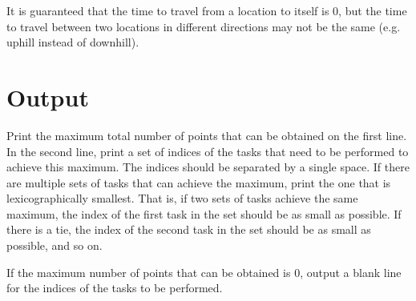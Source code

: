 It is guaranteed that the time to travel from a location to itself is
0, but the time to travel between two locations in different directions may
not be the same (e.g. uphill instead of downhill).

\section*{Output}

Print the maximum total number of points that can be obtained
on the first line.  In the second line, print a set of indices of the
tasks that need to be performed to achieve this maximum.  The indices
should be separated by a single space.  If there are
multiple sets of tasks that can achieve the maximum, print the one
that is lexicographically smallest.  That is, if two sets of tasks
achieve the same maximum, the index of the first task in the set
should be as small as possible.  If there is a tie, the index of the
second task in the set should be as small as possible, and so on.

If the maximum number of points that can be obtained is 0, output a
blank line for the indices of the tasks to be performed.
